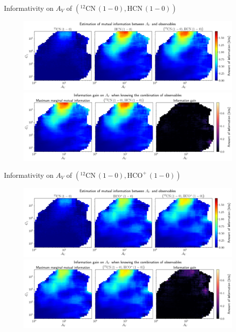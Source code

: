 \documentclass{beamer}
\begin{document}
\begin{frame}{Informativity on $A_V$ of $\left(\mathrm{^{12}CN\,(1-0)},\mathrm{HCN\,(1-0)}\right)$}
    \begin{figure}
        \centering
        \includegraphics[width=0.95\linewidth]{../mi/av__12cn10_hcn10_mi.png}
        \vfill
        \includegraphics[width=0.95\linewidth]{../mi/av__12cn10_hcn10_mi_gain.png}
    \end{figure}
\end{frame}

\begin{frame}{Informativity on $A_V$ of $\left(\mathrm{^{12}CN\,(1-0)},\mathrm{HCO^+\,(1-0)}\right)$}
    \begin{figure}
        \centering
        \includegraphics[width=0.95\linewidth]{../mi/av__12cn10_hcop10_mi.png}
        \vfill
        \includegraphics[width=0.95\linewidth]{../mi/av__12cn10_hcop10_mi_gain.png}
    \end{figure}
\end{frame}
\end{document}
